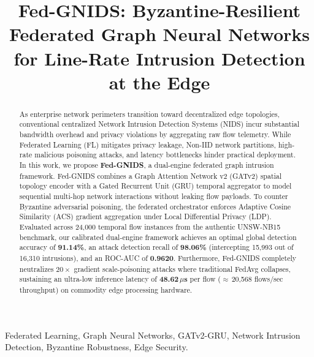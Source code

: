 \documentclass[conference]{IEEEtran}
\begin{document}
\title{Fed-GNIDS: Byzantine-Resilient Federated Graph Neural Networks for Line-Rate Intrusion Detection at the Edge}

\author{
}

\maketitle

\begin{abstract}
As enterprise network perimeters transition toward decentralized edge topologies, conventional centralized Network Intrusion Detection Systems (NIDS) incur substantial bandwidth overhead and privacy violations by aggregating raw flow telemetry. While Federated Learning (FL) mitigates privacy leakage, Non-IID network partitions, high-rate malicious poisoning attacks, and latency bottlenecks hinder practical deployment. In this work, we propose \textbf{Fed-GNIDS}, a dual-engine federated graph intrusion framework. Fed-GNIDS combines a Graph Attention Network v2 (GATv2) spatial topology encoder with a Gated Recurrent Unit (GRU) temporal aggregator to model sequential multi-hop network interactions without leaking flow payloads. To counter Byzantine adversarial poisoning, the federated orchestrator enforces Adaptive Cosine Similarity (ACS) gradient aggregation under Local Differential Privacy (LDP). Evaluated across 24,000 temporal flow instances from the authentic UNSW-NB15 benchmark, our calibrated dual-engine framework achieves an optimal global detection accuracy of \textbf{91.14\%}, an attack detection recall of \textbf{98.06\%} (intercepting 15,993 out of 16,310 intrusions), and an ROC-AUC of \textbf{0.9620}. Furthermore, Fed-GNIDS completely neutralizes $20\times$ gradient scale-poisoning attacks where traditional FedAvg collapses, sustaining an ultra-low inference latency of \textbf{48.62\,$\mu$s} per flow ($\approx$\,20,568 flows/sec throughput) on commodity edge processing hardware.
\end{abstract}

\begin{IEEEkeywords}
Federated Learning, Graph Neural Networks, GATv2-GRU, Network Intrusion Detection, Byzantine Robustness, Edge Security.
\end{IEEEkeywords}
\end{document}
